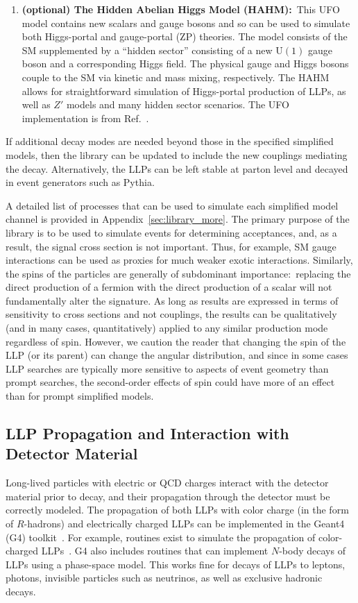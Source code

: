 \begin{enumerate}
\item{\bf (optional) The Hidden Abelian Higgs Model (HAHM):}~This UFO model contains new scalars and gauge bosons and so can be used to simulate both Higgs-portal and gauge-portal (ZP) theories.
The model consists of the SM supplemented by a ``hidden sector'' consisting of a new $\mathrm{U}(1)$ gauge boson and a corresponding Higgs field.
The physical gauge and Higgs bosons couple to the SM via kinetic and mass mixing, respectively.
The HAHM allows for straightforward simulation of Higgs-portal production of LLPs, as well as $Z'$ models and many hidden sector scenarios.
The UFO implementation is from Ref.~\cite{Curtin:2014cca}.

\end{enumerate}
%
If additional decay modes are needed beyond those in the specified simplified models, then the library can be updated to include the new couplings mediating the decay.
Alternatively, the LLPs can be left stable at parton level and decayed in event generators such as Pythia.


A detailed list of processes that can be used to simulate each simplified model channel is provided in Appendix~\ref{sec:library_more}.
The primary purpose of the library is to be used to simulate events for determining acceptances, and, as a result, the signal cross section is not important.
Thus, for example, SM gauge interactions can be used as proxies for much weaker exotic interactions.
Similarly, the spins of the particles are generally of subdominant importance:~replacing the direct production of a fermion with the direct production of a scalar will not fundamentally alter the signature.
As long as results are expressed in terms of sensitivity to cross sections and not couplings, the results can be qualitatively (and in many cases, quantitatively) applied to any similar production mode regardless of spin.
However, we caution the reader that changing the spin of the LLP (or its parent) can change the angular distribution, and since in some cases LLP searches are typically more sensitive to aspects of event geometry than prompt searches, the second-order effects of spin could have more of an effect than for prompt simplified models.

\subsection{LLP Propagation and Interaction with Detector Material}\label{sec:geant}

Long-lived particles with electric or QCD charges interact with the detector material prior to decay, and their propagation through the detector must be correctly modeled.
The propagation of both LLPs with color charge (in the form of $R$-hadrons) and electrically charged LLPs can be implemented in the Geant4 (G4) toolkit~\cite{Agostinelli:2002hh}.
For example, routines exist to simulate the propagation of color-charged LLPs~\cite{Mackeprang:2006gx,Mackeprang:2009ad}.
G4 also includes routines that can implement $N$-body decays of LLPs using a phase-space model.
This works fine for decays of LLPs to leptons, photons, invisible particles such as neutrinos, as well as exclusive hadronic decays. 

